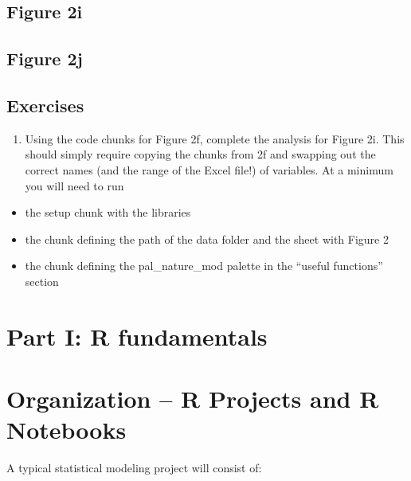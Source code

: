 \documentclass[]{book}
\providecommand{\tightlist}{%
  \setlength{\itemsep}{0pt}\setlength{\parskip}{0pt}}
\begin{document}
\hypertarget{figure-2i}{%
\section{Figure 2i}\label{figure-2i}}

\hypertarget{figure-2j}{%
\section{Figure 2j}\label{figure-2j}}

\hypertarget{exercises}{%
\section{Exercises}\label{exercises}}

\begin{enumerate}
\def\labelenumi{\arabic{enumi}.}
\tightlist
\item
  Using the code chunks for Figure 2f, complete the analysis for Figure 2i. This should simply require copying the chunks from 2f and swapping out the correct names (and the range of the Excel file!) of variables. At a minimum you will need to run
\end{enumerate}

\begin{itemize}
\tightlist
\item
  the setup chunk with the libraries
\item
  the chunk defining the path of the data folder and the sheet with Figure 2
\item
  the chunk defining the pal\_nature\_mod palette in the ``useful functions'' section
\end{itemize}

\hypertarget{part-i-r-fundamentals}{%
\chapter*{Part I: R fundamentals}\label{part-i-r-fundamentals}}

\hypertarget{organization-r-projects-and-r-notebooks}{%
\chapter{Organization -- R Projects and R Notebooks}\label{organization-r-projects-and-r-notebooks}}

A typical statistical modeling project will consist of:
\end{document}
